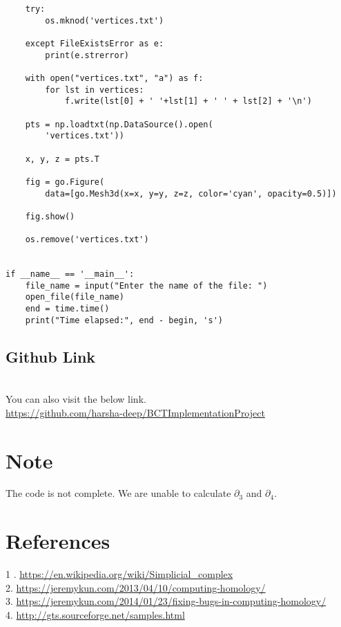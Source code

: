 \documentclass[11pt]{article}
\begin{document}
\begin{verbatim}
    try:
        os.mknod('vertices.txt')

    except FileExistsError as e:
        print(e.strerror)

    with open("vertices.txt", "a") as f:
        for lst in vertices:
            f.write(lst[0] + ' '+lst[1] + ' ' + lst[2] + '\n')

    pts = np.loadtxt(np.DataSource().open(
        'vertices.txt'))

    x, y, z = pts.T

    fig = go.Figure(
        data=[go.Mesh3d(x=x, y=y, z=z, color='cyan', opacity=0.5)])

    fig.show()

    os.remove('vertices.txt')


if __name__ == '__main__':
    file_name = input("Enter the name of the file: ")
    open_file(file_name)
    end = time.time()
    print("Time elapsed:", end - begin, 's')

\end{verbatim}
\subsection{Github Link} \\
You can also visit the below link. \\
\url{https://github.com/harsha-deep/BCTImplementationProject}

\section{Note}
The code is not complete. We are unable to calculate $\partial_3$ and $\partial_4$. 

\section{References}
1 . \url{https://en.wikipedia.org/wiki/Simplicial_complex} \\
2. \url{https://jeremykun.com/2013/04/10/computing-homology/} \\
3. \url{https://jeremykun.com/2014/01/23/fixing-bugs-in-computing-homology/} \\
4. \url{http://gts.sourceforge.net/samples.html}
\end{document}
